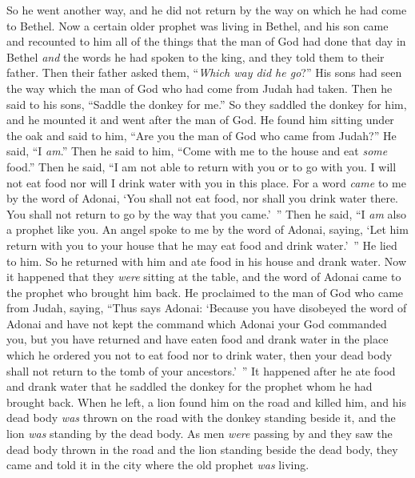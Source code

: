 \begin{biblechapter}
\verse So he went another way, and he did not return by the way on which he had come to Bethel.
 Now a certain older prophet was living in Bethel, and his son came and recounted to him all of the things that the man of God had done that day in Bethel \textit{and} the words he had spoken to the king, and they told them to their father.
\verse Then their father asked them, “\textit{Which way did he go}?” His sons had seen the way which the man of God who had come from Judah had taken.
\verse Then he said to his sons, “Saddle the donkey for me.” So they saddled the donkey for him, and he mounted it
\verse and went after the man of God. He found him sitting under the oak and said to him, “Are you the man of God who came from Judah?” He said, “I \textit{am}.”
\verse Then he said to him, “Come with me to the house and eat \textit{some} food.”
\verse Then he said, “I am not able to return with you or to go with you. I will not eat food nor will I drink water with you in this place.
\verse For a word \textit{came} to me by the word of Adonai, ‘You shall not eat food, nor shall you drink water there. You shall not return to go by the way that you came.’ ”
\verse Then he said, “I \textit{am} also a prophet like you. An angel spoke to me by the word of Adonai, saying, ‘Let him return with you to your house that he may eat food and drink water.’ ” He lied to him.
\verse So he returned with him and ate food in his house and drank water.
\verse Now it happened that they \textit{were} sitting at the table, and the word of Adonai came to the prophet who brought him back.
\verse He proclaimed to the man of God who came from Judah, saying, “Thus says Adonai: ‘Because you have disobeyed the word of Adonai and have not kept the command which Adonai your God commanded you,
\verse but you have returned and have eaten food and drank water in the place which he ordered you not to eat food nor to drink water, then your dead body shall not return to the tomb of your ancestors.’ ”
 It happened after he ate food and drank water that he saddled the donkey for the prophet whom he had brought back.
\verse When he left, a lion found him on the road and killed him, and his dead body \textit{was} thrown on the road with the donkey standing beside it, and the lion \textit{was} standing by the dead body.
\verse As men \textit{were} passing by and they saw the dead body thrown in the road and the lion standing beside the dead body, they came and told it in the city where the old prophet \textit{was} living.

\end{biblechapter}
